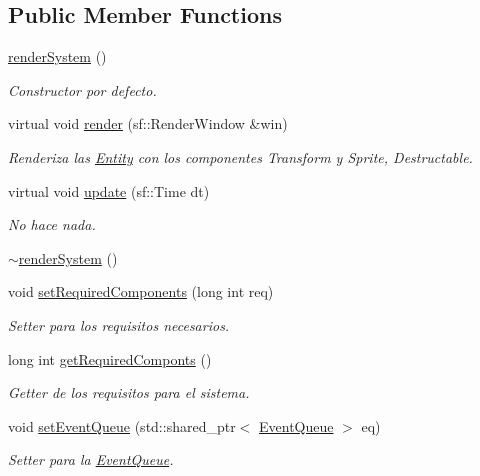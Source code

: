 \subsection*{Public Member Functions}
\begin{DoxyCompactItemize}
\item 
\hyperlink{classant_1_1render_system_a519835cb3318b0eaad3b5143b3d23121}{render\+System} ()
\begin{DoxyCompactList}\small\item\em Constructor por defecto. \end{DoxyCompactList}\item 
virtual void \hyperlink{classant_1_1render_system_ad5284fb701e3d9ea1c3645e553083ba6}{render} (sf\+::\+Render\+Window \&win)
\begin{DoxyCompactList}\small\item\em Renderiza las \hyperlink{classant_1_1_entity}{Entity} con los componentes Transform y Sprite, Destructable. \end{DoxyCompactList}\item 
virtual void \hyperlink{classant_1_1render_system_a9a8fd550b795db266510831276bfe957}{update} (sf\+::\+Time dt)
\begin{DoxyCompactList}\small\item\em No hace nada. \end{DoxyCompactList}\item 
\hyperlink{classant_1_1render_system_a44a7a39c0946d5d9d2d8e7287860d071}{$\sim$render\+System} ()
\item 
void \hyperlink{classant_1_1_system_a35662ff3739ff4290df1106bfdccfaca}{set\+Required\+Components} (long int req)
\begin{DoxyCompactList}\small\item\em Setter para los requisitos necesarios. \end{DoxyCompactList}\item 
long int \hyperlink{classant_1_1_system_a2d94338969f43d4fd2fd972deb099258}{get\+Required\+Componts} ()
\begin{DoxyCompactList}\small\item\em Getter de los requisitos para el sistema. \end{DoxyCompactList}\item 
void \hyperlink{classant_1_1_system_a1effe9f0e5615e516a34be02d5895434}{set\+Event\+Queue} (std\+::shared\+\_\+ptr$<$ \hyperlink{classant_1_1_event_queue}{Event\+Queue} $>$ eq)
\begin{DoxyCompactList}\small\item\em Setter para la \hyperlink{classant_1_1_event_queue}{Event\+Queue}. \end{DoxyCompactList}\item 

\end{DoxyCompactItemize}
